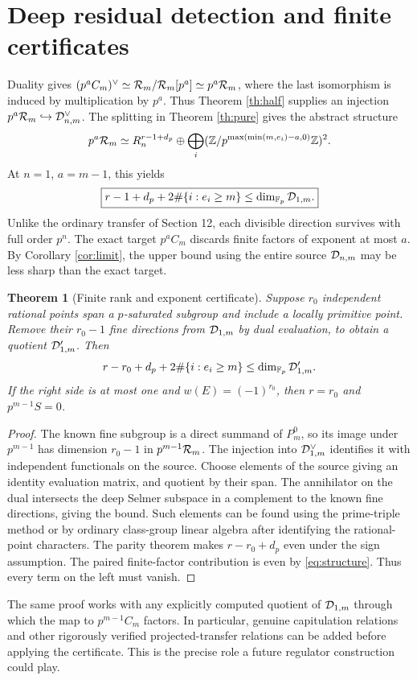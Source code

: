 \documentclass[11pt,a4paper]{article}
\newtheorem{theorem}{Theorem}[section]
\theoremstyle{definition}\newtheorem{definition}[theorem]{Definition}
\theoremstyle{remark}\newtheorem{remark}[theorem]{Remark}
\numberwithin{equation}{section}
\begin{document}
\section{Deep residual detection and finite certificates}
Duality gives $(p^aC_m)^\vee\simeq\mathcal R_m/\mathcal R_m[p^a]\simeq p^a\mathcal R_m$, where the last isomorphism is induced by multiplication by $p^a$. Thus Theorem \ref{th:half} supplies an injection $p^a\mathcal R_m\hookrightarrow\mathcal D_{n,m}^\vee$. The splitting in Theorem \ref{th:pure} gives the abstract structure
\begin{equation}\label{eq:deep}
p^a\mathcal R_m\simeq R_n^{r-1+d_p}\oplus
\bigoplus_i(\mathbb Z/p^{\max(\min(m,e_i)-a,0)}\mathbb Z)^2.
\end{equation}
At $n=1$, $a=m-1$, this yields
\begin{equation}\label{eq:resbound}
\boxed{r-1+d_p+2\#\{i:e_i\ge m\}\le\dim_{\mathbb F_p}\mathcal D_{1,m}.}
\end{equation}
Unlike the ordinary transfer of Section 12, each divisible direction survives with full order $p^n$. The exact target $p^aC_m$ discards finite factors of exponent at most $a$. By Corollary \ref{cor:limit}, the upper bound using the entire source $\mathcal D_{n,m}$ may be less sharp than the exact target.

\begin{theorem}[Finite rank and exponent certificate]\label{th:certificate}
Suppose $r_0$ independent rational points span a $p$-saturated subgroup and include a locally primitive point. Remove their $r_0-1$ fine directions from $\mathcal D_{1,m}$ by dual evaluation, to obtain a quotient $\mathcal D'_{1,m}$. Then
\[
r-r_0+d_p+2\#\{i:e_i\ge m\}\le\dim_{\mathbb F_p}\mathcal D'_{1,m}.
\]
If the right side is at most one and $w(E)=(-1)^{r_0}$, then $r=r_0$ and $p^{m-1}S=0$.
\end{theorem}
\begin{proof}
The known fine subgroup is a direct summand of $P_m^0$, so its image under $p^{m-1}$ has dimension $r_0-1$ in $p^{m-1}\mathcal R_m$. The injection into $\mathcal D_{1,m}^\vee$ identifies it with independent functionals on the source. Choose elements of the source giving an identity evaluation matrix, and quotient by their span. The annihilator on the dual intersects the deep Selmer subspace in a complement to the known fine directions, giving the bound. Such elements can be found using the prime-triple method or by ordinary class-group linear algebra after identifying the rational-point characters. The parity theorem makes $r-r_0+d_p$ even under the sign assumption. The paired finite-factor contribution is even by \eqref{eq:structure}. Thus every term on the left must vanish.\end{proof}
The same proof works with any explicitly computed quotient of $\mathcal D_{1,m}$ through which the map to $p^{m-1}C_m$ factors. In particular, genuine capitulation relations and other rigorously verified projected-transfer relations can be added before applying the certificate. This is the precise role a future regulator construction could play.
\end{document}
